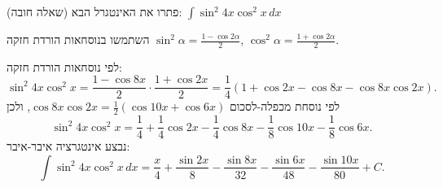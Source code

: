 
\begin{question}
(שאלה חובה)
פתרו את האינטגרל הבא:
$\displaystyle\int\sin^2 4x\cos^2 x\,dx$
\end{question}

\begin{hint}
השתמשו בנוסחאות הורדת חזקה $\sin^2\alpha=\frac{1-\cos2\alpha}{2}$, $\cos^2\alpha=\frac{1+\cos2\alpha}{2}$.
\end{hint}

\begin{solution}
לפי נוסחאות הורדת חזקה:
\[ \sin^2 4x\cos^2x=\frac{1-\cos8x}{2}\cdot\frac{1+\cos2x}{2}=\frac14\left(1+\cos2x-\cos8x-\cos8x\cos2x\right). \]
לפי נוסחת מכפלה-לסכום $\cos8x\cos2x=\frac12(\cos10x+\cos6x)$, ולכן
\[ \sin^2 4x\cos^2x=\frac14+\frac14\cos2x-\frac14\cos8x-\frac18\cos10x-\frac18\cos6x. \]
נבצע אינטגרציה איבר-איבר:
\[ \boxed{\int\sin^2 4x\cos^2x\,dx=\frac{x}{4}+\frac{\sin2x}{8}-\frac{\sin8x}{32}-\frac{\sin6x}{48}-\frac{\sin10x}{80}+C}. \]
\end{solution}
